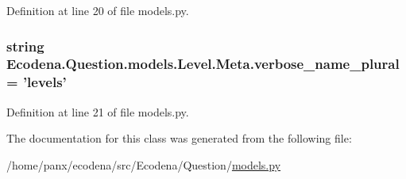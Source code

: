 Definition at line 20 of file models.py.

\hypertarget{class_ecodena_1_1_question_1_1models_1_1_level_1_1_meta_a0bcd87e70ea14c111af94c17deb2257e}{
\subsubsection[{verbose\_\-name\_\-plural}]{\setlength{\rightskip}{0pt plus 5cm}string {\bf Ecodena.Question.models.Level.Meta.verbose\_\-name\_\-plural} = 'levels'}}
\label{dd/dc4/class_ecodena_1_1_question_1_1models_1_1_level_1_1_meta_a0bcd87e70ea14c111af94c17deb2257e}


Definition at line 21 of file models.py.



The documentation for this class was generated from the following file:\begin{DoxyCompactItemize}
\item 
/home/panx/ecodena/src/Ecodena/Question/\hyperlink{_question_2models_8py}{models.py}\end{DoxyCompactItemize}
